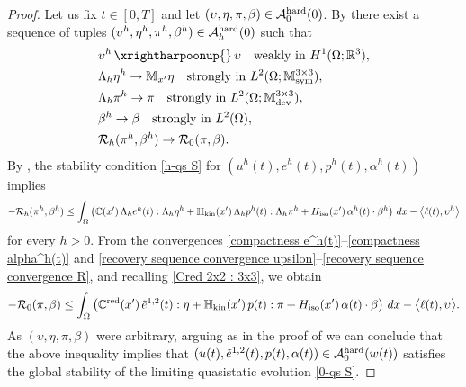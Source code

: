 \documentclass[reqno,10pt]{amsart}
\numberwithin{equation}{section}
\theoremstyle{remark}
\newcommand{\RED}{\color{black}}
\newcommand{\BLACK}{\color{black}}
\newcommand{\calA}{\mathcal{A}}
\newcommand{\C}{\mathbb{C}}
\newcommand{\M}{\mathbb{M}}
\newcommand{\R}{\mathbb{R}}
\newcommand{\calR}{\mathcal{R}}
\DeclareMathOperator{\dev}{dev}
\DeclareMathOperator{\sym}{sym}
\newcommand{\strong}{\to}
\newcommand{\weak}{\,\xrightharpoonup{}\,}
\newcommand{\Hkin}{\mathbb{H}_{\rm kin}}
\newcommand{\Hiso}{H_{\rm iso}}
\newcommand{\red}[1]{#1^{\rm red}}
\begin{document}
\begin{proof}
\medskip
{} \nopagebreak

Let us fix $t \in [0, T]$ and let $(\upsilon, \eta, \pi, \beta) \in \calA_{0}^{\rm hard}(0)$. 
By  there exist a sequence of tuples $(\upsilon^h, \eta^h, \pi^h, \beta^h) \in \calA_{h}^{\rm hard}(0)$ such that
\begin{align}
	& \upsilon^h \weak \upsilon \quad \text{weakly in $H^1(\Omega;\R^3)$}, \label{recovery sequence convergence upsilon}\\
	& \Lambda_h \eta^h \strong \M_{x'} \eta \quad \text{strongly in $L^2(\Omega;\M^{3 \times 3}_{\sym})$}, \label{recovery sequence convergence eta}\\
	& \Lambda_h \pi^h \strong \pi \quad \text{strongly in $L^2(\Omega;\M^{3 \times 3}_{\dev})$}, \label{recovery sequence convergence pi}\\
	& \beta^h \strong \beta \quad \text{strongly in $L^2(\Omega)$}, \label{recovery sequence convergence beta}\\
	& \calR_{h}(\pi^h, \beta^h) \to \calR_{0}(\pi, \beta) \label{recovery sequence convergence R}.
\end{align}
By , the stability condition \ref{h-qs S} for $(u^h(t), e^h(t), p^h(t), \alpha^h(t))$ implies
\begin{align*}
	- \calR_{h}(\pi^h, \beta^h) \leq 
	\int_{\Omega} \left( \C\!\left(x'\right) \Lambda_h e^h(t) : \Lambda_h \eta^h + \Hkin\!\left(x'\right) \Lambda_h p^h(t) : \Lambda_h \pi^h + \Hiso\!\left(x'\right) \alpha^h(t) \cdot \beta^h \right) \,dx 
	- \big\langle \ell(t), \upsilon^h \big\rangle
\end{align*}
for every $h > 0$.
From the convergences \eqref{compactness e^h(t)}--\eqref{compactness alpha^h(t)} and \eqref{recovery sequence convergence upsilon}--\eqref{recovery sequence convergence R}, and recalling \eqref{Cred 2x2 : 3x3}, we obtain 
\begin{align*}
	- \calR_{0}(\pi, \beta) \leq 
	\int_{\Omega} \left( \red{\C}\!\left(x'\right) \tilde{e}^{1,2}(t) : \eta + \Hkin\!\left(x'\right) p(t) : \pi + \Hiso\!\left(x'\right) \alpha(t) \cdot \beta \right) \,dx 
	- \big\langle \ell(t), \upsilon \big\rangle.
\end{align*}
As $(\upsilon, \eta, \pi, \beta)$ were arbitrary, arguing as in the proof of  we can conclude that the above inequality implies that $(u(t), \tilde{e}^{1,2}(t), p(t), \alpha(t)) \in \calA_{0}^{\rm hard}(w(t))$ {\RED satisfies\BLACK} the global stability of the limiting quasistatic evolution \ref{0-qs S}.


\end{proof}
\end{document}
